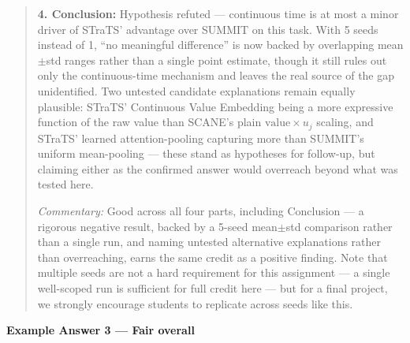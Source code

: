 \documentclass{article}
\begin{document}
\begin{quote}
\textbf{4. Conclusion:} Hypothesis refuted --- continuous time is at most a minor driver of STraTS' advantage over SUMMIT on this task. With 5 seeds instead of 1, ``no meaningful difference'' is now backed by overlapping mean$\pm$std ranges rather than a single point estimate, though it still rules out only the continuous-time mechanism and leaves the real source of the gap unidentified. Two untested candidate explanations remain equally plausible: STraTS' Continuous Value Embedding being a more expressive function of the raw value than SCANE's plain $\text{value} \times u_j$ scaling, and STraTS' learned attention-pooling capturing more than SUMMIT's uniform mean-pooling --- these stand as hypotheses for follow-up, but claiming either as the confirmed answer would overreach beyond what was tested here.

\emph{Commentary:} Good across all four parts, including Conclusion --- a rigorous negative result, backed by a 5-seed mean$\pm$std comparison rather than a single run, and naming untested alternative explanations rather than overreaching, earns the same credit as a positive finding. Note that multiple seeds are not a hard requirement for this assignment --- a single well-scoped run is sufficient for full credit here --- but for a final project, we strongly encourage students to replicate across seeds like this.
\end{quote}

\bigskip
\noindent\textbf{Example Answer 3 --- Fair overall}
\end{document}

